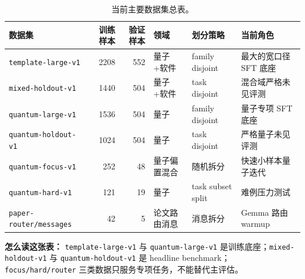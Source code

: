 \documentclass[11pt,a4paper]{article}
\newcommand{\code}[1]{\begingroup\ttfamily\footnotesize\nolinkurl{#1}\endgroup}
\begin{document}
\begin{table}[htbp]
\centering
\small
\begin{tabularx}{\textwidth}{p{2.8cm} r r p{1.8cm} p{2.1cm} Y}
\toprule
数据集 & 训练样本 & 验证样本 & 领域 & 划分策略 & 当前角色 \\
\midrule
\code{template-large-v1} & 2208 & 552 & 量子+软件 & family disjoint & 最大的宽口径 SFT 底座 \\
\code{mixed-holdout-v1} & 1440 & 504 & 量子+软件 & task disjoint & 混合域严格未见评测 \\
\code{quantum-large-v1} & 1536 & 504 & 量子 & family disjoint & 量子专项 SFT 底座 \\
\code{quantum-holdout-v1} & 1024 & 504 & 量子 & task disjoint & 严格量子未见评测 \\
\code{quantum-focus-v1} & 252 & 48 & 量子偏置混合 & 随机拆分 & 快速小样本量子迭代 \\
\code{quantum-hard-v1} & 121 & 19 & 量子 & task subset split & 难例压力测试 \\
\code{paper-router/messages} & 42 & 5 & 论文路由消息 & 消息拆分 & Gemma 路由 warmup \\
\bottomrule
\end{tabularx}
\caption{当前主要数据集总表。}
\label{tab:dataset-inventory}
\end{table}

\noindent\textbf{怎么读这张表：} \code{template-large-v1} 与 \code{quantum-large-v1} 是训练底座；\code{mixed-holdout-v1} 与 \code{quantum-holdout-v1} 是 headline benchmark；\code{focus/hard/router} 三类数据只服务专项任务，不能替代主评估。
\end{document}
